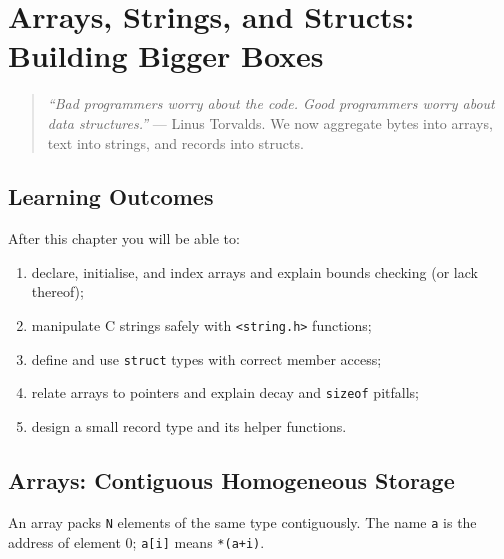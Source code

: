 \chapter{Arrays, Strings, and Structs: Building Bigger Boxes}
\label{ch:arrays-strings-structs}

\begin{quote}
\emph{``Bad programmers worry about the code. Good programmers worry about data structures.''} --- Linus Torvalds. We now aggregate bytes into arrays, text into strings, and records into structs.
\end{quote}

\noindent{}

\section*{Learning Outcomes}
After this chapter you will be able to:
\begin{enumerate}[label=(L\arabic*)]
    \item declare, initialise, and index arrays and explain bounds checking (or lack thereof);
    \item manipulate C strings safely with \texttt{<string.h>} functions;
    \item define and use \texttt{struct} types with correct member access;
    \item relate arrays to pointers and explain decay and \texttt{sizeof} pitfalls;
    \item design a small record type and its helper functions.
\end{enumerate}

\section{Arrays: Contiguous Homogeneous Storage}
\label{sec:arrays}
An array packs \texttt{N} elements of the same type contiguously. The name \texttt{a} is the address of element 0; \texttt{a[i]} means \texttt{*(a+i)}.


